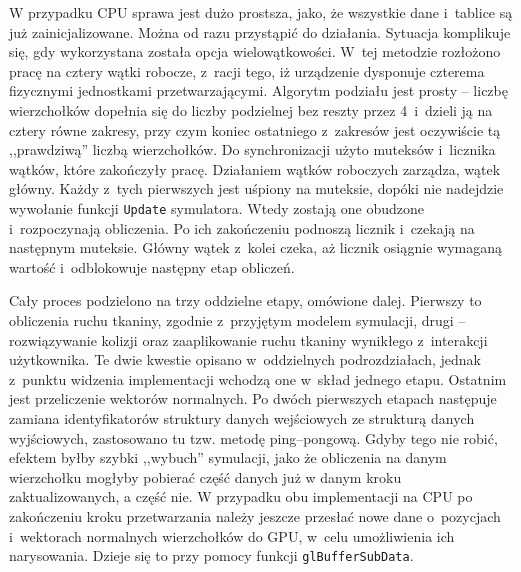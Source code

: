 		W przypadku CPU sprawa jest dużo prostsza, jako, że wszystkie dane i~tablice są już zainicjalizowane. Można od razu przystąpić do działania. Sytuacja komplikuje się, gdy wykorzystana została opcja wielowątkowości. W~tej metodzie rozłożono pracę na cztery wątki robocze, z~racji tego, iż urządzenie dysponuje czterema fizycznymi jednostkami przetwarzającymi. Algorytm podziału jest prosty -- liczbę wierzchołków dopełnia się do liczby podzielnej bez reszty przez 4~i~dzieli ją na cztery równe zakresy, przy czym koniec ostatniego z~zakresów jest oczywiście tą ,,prawdziwą'' liczbą wierzchołków. Do synchronizacji użyto muteksów i~licznika wątków, które zakończyły pracę. Działaniem wątków roboczych zarządza, wątek główny. Każdy z~tych pierwszych jest uśpiony na muteksie, dopóki nie nadejdzie wywołanie funkcji \texttt{Update} symulatora. Wtedy zostają one obudzone i~rozpoczynają obliczenia. Po ich zakończeniu podnoszą licznik i~czekają na następnym muteksie. Główny wątek z~kolei czeka, aż licznik osiągnie wymaganą wartość i~odblokowuje następny etap obliczeń.
		
		Cały proces podzielono na trzy oddzielne etapy, omówione dalej. Pierwszy to obliczenia ruchu tkaniny, zgodnie z~przyjętym modelem symulacji, drugi -- rozwiązywanie kolizji oraz zaaplikowanie ruchu tkaniny wynikłego z~interakcji użytkownika. Te dwie kwestie opisano w~oddzielnych podrozdziałach, jednak z~punktu widzenia implementacji wchodzą one w~skład jednego etapu. Ostatnim jest przeliczenie wektorów normalnych. Po dwóch pierwszych etapach następuje zamiana identyfikatorów struktury danych wejściowych ze strukturą danych wyjściowych, zastosowano tu tzw. metodę ping--pongową. Gdyby tego nie robić, efektem byłby szybki ,,wybuch'' symulacji, jako że obliczenia na danym wierzchołku mogłyby pobierać część danych już w danym kroku zaktualizowanych, a część nie. W przypadku obu implementacji na CPU po zakończeniu kroku przetwarzania należy jeszcze przesłać nowe dane o~pozycjach i~wektorach normalnych wierzchołków do GPU, w~celu umożliwienia ich narysowania. Dzieje się to przy pomocy funkcji \texttt{glBufferSubData}.
		
